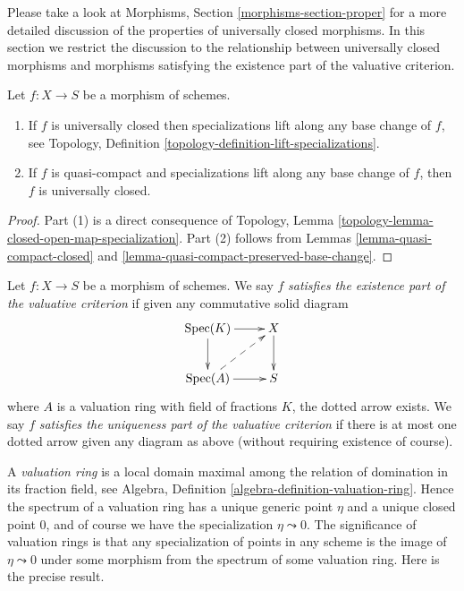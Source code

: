 \medskip\noindent
Please take a look at Morphisms, Section \ref{morphisms-section-proper} for a
more detailed discussion of the properties of universally closed morphisms.
In this section we restrict the discussion to the relationship between
universally closed morphisms and morphisms satisfying the
existence part of the valuative criterion.

\begin{lemma}
\label{lemma-specializations-lift}
Let $f : X \to S$ be a morphism of schemes.
\begin{enumerate}
\item If $f$ is universally closed then specializations lift
along any base change of $f$, see
Topology, Definition \ref{topology-definition-lift-specializations}.
\item If $f$ is quasi-compact and specializations lift
along any base change of $f$, then $f$ is universally closed.
\end{enumerate}
\end{lemma}

\begin{proof}
Part (1) is a direct consequence of
Topology, Lemma \ref{topology-lemma-closed-open-map-specialization}.
Part (2) follows from
Lemmas \ref{lemma-quasi-compact-closed} and
\ref{lemma-quasi-compact-preserved-base-change}.
\end{proof}

\begin{definition}
\label{definition-valuative-criterion}
Let $f : X \to S$ be a morphism of schemes. We say $f$
{\it satisfies the existence part of the valuative criterion}
if given any commutative solid diagram
$$
\xymatrix{
\Spec(K) \ar[r] \ar[d] & X \ar[d] \\
\Spec(A) \ar[r] \ar@{-->}[ru] & S
}
$$
where $A$ is a valuation ring with field of fractions $K$, the
dotted arrow exists. We say $f$ {\it satisfies the uniqueness
part of the valuative criterion} if there is at most one
dotted arrow given any diagram as above (without requiring
existence of course).
\end{definition}

\noindent
A {\it valuation ring} is a local domain maximal among the relation
of domination in its fraction field, see
Algebra, Definition \ref{algebra-definition-valuation-ring}.
Hence the spectrum of a valuation ring has a unique generic point
$\eta$ and a unique closed point $0$, and of course we have the
specialization $\eta \leadsto 0$.
The significance of valuation rings is that any specialization of
points in any scheme is the image of $\eta \leadsto 0$
under some morphism from the spectrum of some valuation ring.
Here is the precise result.

